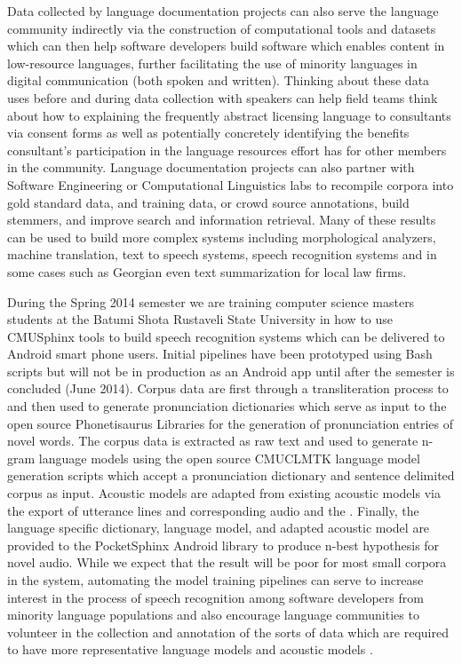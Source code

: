 \documentclass[11pt]{article}
\begin{document}
\label{sec:complinguistics}
Data collected by language documentation projects can also serve the language community indirectly via the construction of computational tools and datasets which can then help software developers build software which enables content in low-resource languages, further facilitating the use of minority languages in digital communication (both spoken and written). Thinking about these data uses before and during data collection with speakers can help field teams think about how to explaining the frequently abstract licensing language to consultants via consent forms as well as potentially concretely identifying the benefits  consultant's participation in the language resources effort has for other members in the community. Language documentation projects can also partner with Software Engineering or Computational Linguistics labs to recompile corpora into gold standard data, and training data, or crowd source annotations, build stemmers, and improve search and information retrieval. Many of these results can be used to build more complex systems including morphological analyzers, machine translation, text to speech systems, speech recognition systems and in some cases such as Georgian even text summarization for local law firms.

During the Spring 2014 semester we are training computer science masters students at the Batumi Shota Rustaveli  State University in how to use CMUSphinx tools to build speech recognition systems which can be delivered to Android smart phone users. Initial pipelines have been prototyped using Bash scripts but will not be in production as an Android app until after the semester is concluded (June 2014). Corpus data are first through a transliteration process to and then used to generate pronunciation dictionaries which serve as input  to the open source Phonetisaurus Libraries \cite{Novak:2012} for the generation of pronunciation entries of novel words. The corpus data is extracted as raw text and used to generate n-gram language models using the open source CMUCLMTK \cite{Clarkson:1997} language model generation scripts which accept a pronunciation dictionary and sentence delimited corpus as input. Acoustic models are adapted from existing acoustic models via the export of utterance lines and corresponding audio and the  \cite{Elmahdy:2010}. Finally, the language specific dictionary, language model, and adapted acoustic model are provided to the PocketSphinx Android library to produce n-best hypothesis for novel audio. While we expect that the result will be poor for most small corpora in the system, automating the model training pipelines can serve to increase interest in the process of speech recognition among software developers from minority language populations  and also encourage language communities to volunteer in the collection and annotation of the sorts of data which are required to have more representative language models and acoustic models \cite{Sarfraz:2010}. 
\end{document}
